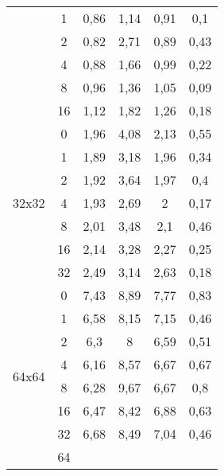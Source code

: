 \begin{table}[!h]
\begin{tabular}{|c|c|cccc|}
		& 1                                 &   0,86   &   1,14   &    0,91    &       0,1         \\
		& 2                                 &  0,82    &  2,71    &  0,89      &    0,43            \\
		& 4                                 &  0,88    &   1,66   &   0,99     &   0,22             \\
		& 8                                 &    0,96  &  1,36    &  1,05      &   0,09             \\
		& 16                                &    1,12  &  1,82    &   1,26     &      0,18          \\ \hline
		\multirow{7}{*}{32x32}      & 0      &    1,96  &    4,08  &    2,13    &    0,55            \\
		& 1                                 &   1,89   &  3,18    &  1,96      &   0,34             \\
		& 2                                 &   1,92   &  3,64    &  1,97      &      0,4          \\
		& 4                                 &    1,93  &   2,69   &  2      &   0,17             \\
		& 8                                 &   2,01   &   3,48   &   2,1     &      0,46          \\
		& 16                                &    2,14  &   3,28   &   2,27     &       0,25         \\
		& 32                                &     2,49 &   3,14   &   2,63     &       0,18         \\ \hline
		\multirow{8}{*}{64x64}      & 0     &    7,43  &   8,89   &    7,77   &   0,83             \\
		& 1                                 &   6,58   &   8,15   &   7,15     &     0,46           \\
		& 2                                 &   6,3   & 8     &  6,59      &    0,51            \\
		& 4                                 &   6,16   & 8,57     &  6,67      &  0,67              \\
		& 8                                 &    6,28  &   9,67   &  6,67      &  0,8              \\
		& 16                                &  6,47    &  8,42    &  6,88      &   0,63             \\
		& 32                                &  6,68    &  8,49    &  7,04      &   0,46             \\
		& 64                                &      &      &        &               \\ \hline
	\end{tabular}
\end{table}
